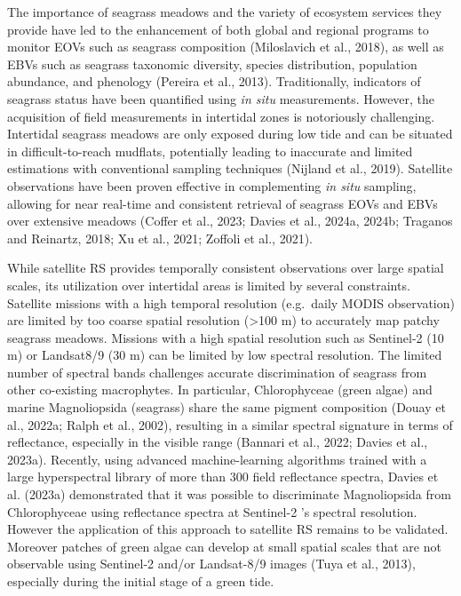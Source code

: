 \documentclass[
  letterpaper,
  11pt,
  english,
  singlespacing,
  headsepline]{MastersDoctoralThesis}
\begin{document}
\begin{spacing}{1.5}
The importance of seagrass meadows and the variety of ecosystem services
they provide have led to the enhancement of both global and regional
programs to monitor EOVs such as seagrass composition (Miloslavich et
al., 2018), as well as EBVs such as seagrass taxonomic diversity,
species distribution, population abundance, and phenology (Pereira et
al., 2013). Traditionally, indicators of seagrass status have been
quantified using \emph{in situ} measurements. However, the acquisition
of field measurements in intertidal zones is notoriously challenging.
Intertidal seagrass meadows are only exposed during low tide and can be
situated in difficult-to-reach mudflats, potentially leading to
inaccurate and limited estimations with conventional sampling techniques
(Nijland et al., 2019). Satellite observations have been proven
effective in complementing \emph{in situ} sampling, allowing for near
real-time and consistent retrieval of seagrass EOVs and EBVs over
extensive meadows (Coffer et al., 2023; Davies et al., 2024a, 2024b;
Traganos and Reinartz, 2018; Xu et al., 2021; Zoffoli et al., 2021).

While satellite RS provides temporally consistent observations over
large spatial scales, its utilization over intertidal areas is limited
by several constraints. Satellite missions with a high temporal
resolution (e.g.~daily MODIS observation) are limited by too coarse
spatial resolution (\textgreater100 m) to accurately map patchy seagrass
meadows. Missions with a high spatial resolution such as Sentinel-2 (10
m) or Landsat8/9 (30 m) can be limited by low spectral resolution. The
limited number of spectral bands challenges accurate discrimination of
seagrass from other co-existing macrophytes. In particular,
Chlorophyceae (green algae) and marine Magnoliopsida (seagrass) share
the same pigment composition (Douay et al., 2022a; Ralph et al., 2002),
resulting in a similar spectral signature in terms of reflectance,
especially in the visible range (Bannari et al., 2022; Davies et al.,
2023a). Recently, using advanced machine-learning algorithms trained
with a large hyperspectral library of more than 300 field reflectance
spectra, Davies et al. (2023a) demonstrated that it was possible to
discriminate Magnoliopsida from Chlorophyceae using reflectance spectra
at Sentinel-2 's spectral resolution. However the application of this
approach to satellite RS remains to be validated. Moreover patches of
green algae can develop at small spatial scales that are not observable
using Sentinel-2 and/or Landsat-8/9 images (Tuya et al., 2013),
especially during the initial stage of a green tide.


\end{spacing}
\end{document}
